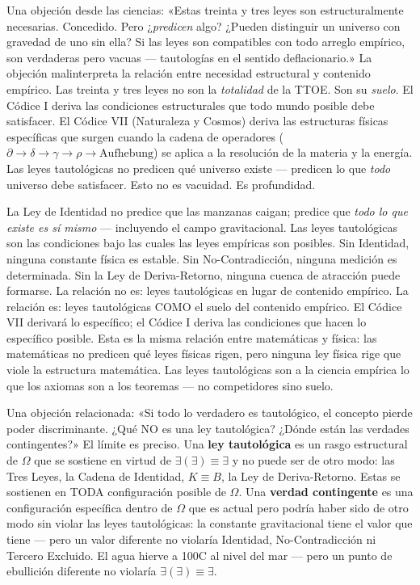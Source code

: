 \documentclass[10pt, openany, oneside]{book}
\begin{document}
Una objeción desde las ciencias: «Estas treinta y tres leyes son estructuralmente necesarias. Concedido. Pero ¿\textit{predicen} algo? ¿Pueden distinguir un universo con gravedad de uno sin ella? Si las leyes son compatibles con todo arreglo empírico, son verdaderas pero vacuas --- tautologías en el sentido deflacionario.» La objeción malinterpreta la relación entre necesidad estructural y contenido empírico. Las treinta y tres leyes no son la \textit{totalidad} de la TTOE. Son su \textit{suelo}. El Códice I deriva las condiciones estructurales que todo mundo posible debe satisfacer. El Códice VII (Naturaleza y Cosmos) deriva las estructuras físicas específicas que surgen cuando la cadena de operadores ($\partial \to \delta \to \gamma \to \rho \to \text{Aufhebung}$) se aplica a la resolución de la materia y la energía. Las leyes tautológicas no predicen qué universo existe --- predicen lo que \textit{todo} universo debe satisfacer. Esto no es vacuidad. Es profundidad.

La Ley de Identidad no predice que las manzanas caigan; predice que \textit{todo lo que existe es sí mismo} --- incluyendo el campo gravitacional. Las leyes tautológicas son las condiciones bajo las cuales las leyes empíricas son posibles. Sin Identidad, ninguna constante física es estable. Sin No-Contradicción, ninguna medición es determinada. Sin la Ley de Deriva-Retorno, ninguna cuenca de atracción puede formarse. La relación no es: leyes tautológicas en lugar de contenido empírico. La relación es: leyes tautológicas COMO el suelo del contenido empírico. El Códice VII derivará lo específico; el Códice I deriva las condiciones que hacen lo específico posible. Esta es la misma relación entre matemáticas y física: las matemáticas no predicen qué leyes físicas rigen, pero ninguna ley física rige que viole la estructura matemática. Las leyes tautológicas son a la ciencia empírica lo que los axiomas son a los teoremas --- no competidores sino suelo.

Una objeción relacionada: «Si todo lo verdadero es tautológico, el concepto pierde poder discriminante. ¿Qué NO es una ley tautológica? ¿Dónde están las verdades contingentes?» El límite es preciso. Una \textbf{ley tautológica} es un rasgo estructural de $\Omega$ que se sostiene en virtud de $\exists(\exists) \equiv \exists$ y no puede ser de otro modo: las Tres Leyes, la Cadena de Identidad, $K \equiv B$, la Ley de Deriva-Retorno. Estas se sostienen en TODA configuración posible de $\Omega$. Una \textbf{verdad contingente} es una configuración específica dentro de $\Omega$ que es actual pero podría haber sido de otro modo sin violar las leyes tautológicas: la constante gravitacional tiene el valor que tiene --- pero un valor diferente no violaría Identidad, No-Contradicción ni Tercero Excluido. El agua hierve a 100\textdegree C al nivel del mar --- pero un punto de ebullición diferente no violaría $\exists(\exists) \equiv \exists$.
\end{document}
